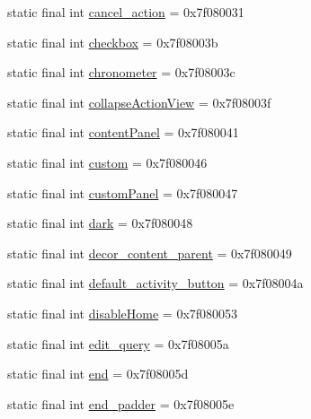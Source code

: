\begin{DoxyCompactItemize}
\item 
static final int \mbox{\hyperlink{classcom_1_1google_1_1android_1_1gms_1_1R_1_1id_aca37f162b8f3ae2cd62fa79e02360013}{cancel\+\_\+action}} = 0x7f080031
\item 
static final int \mbox{\hyperlink{classcom_1_1google_1_1android_1_1gms_1_1R_1_1id_aff61d000eabc6c95cc2b581cb82c539c}{checkbox}} = 0x7f08003b
\item 
static final int \mbox{\hyperlink{classcom_1_1google_1_1android_1_1gms_1_1R_1_1id_a2cdd0608eb7890dd84b1ee9c8e24869d}{chronometer}} = 0x7f08003c
\item 
static final int \mbox{\hyperlink{classcom_1_1google_1_1android_1_1gms_1_1R_1_1id_a7b72f687177eb88aa5803caab66fad1a}{collapse\+Action\+View}} = 0x7f08003f
\item 
static final int \mbox{\hyperlink{classcom_1_1google_1_1android_1_1gms_1_1R_1_1id_a9fb201b9d91402750993d4fae21aefe9}{content\+Panel}} = 0x7f080041
\item 
static final int \mbox{\hyperlink{classcom_1_1google_1_1android_1_1gms_1_1R_1_1id_a6806830d9e9d48de988e9d3dd2b0370f}{custom}} = 0x7f080046
\item 
static final int \mbox{\hyperlink{classcom_1_1google_1_1android_1_1gms_1_1R_1_1id_a343610fb96592a2eef6a718d5439aa1a}{custom\+Panel}} = 0x7f080047
\item 
static final int \mbox{\hyperlink{classcom_1_1google_1_1android_1_1gms_1_1R_1_1id_ad4e02011f5e0cc3a2197b46ccb27eaa1}{dark}} = 0x7f080048
\item 
static final int \mbox{\hyperlink{classcom_1_1google_1_1android_1_1gms_1_1R_1_1id_a7f14d76052b8044caa5131884a9c485f}{decor\+\_\+content\+\_\+parent}} = 0x7f080049
\item 
static final int \mbox{\hyperlink{classcom_1_1google_1_1android_1_1gms_1_1R_1_1id_a2bea0da390acc8e80cafc9a3999bd225}{default\+\_\+activity\+\_\+button}} = 0x7f08004a
\item 
static final int \mbox{\hyperlink{classcom_1_1google_1_1android_1_1gms_1_1R_1_1id_aeb973dd1584d0143bfdb11d6e1b0a75e}{disable\+Home}} = 0x7f080053
\item 
static final int \mbox{\hyperlink{classcom_1_1google_1_1android_1_1gms_1_1R_1_1id_aa2400ae2f5a0830a179d85ae609cded9}{edit\+\_\+query}} = 0x7f08005a
\item 
static final int \mbox{\hyperlink{classcom_1_1google_1_1android_1_1gms_1_1R_1_1id_a5a99f00bcab168defeb9ced2962e8236}{end}} = 0x7f08005d
\item 
static final int \mbox{\hyperlink{classcom_1_1google_1_1android_1_1gms_1_1R_1_1id_a4d80e222ec6bae5546b705bb6222ba5a}{end\+\_\+padder}} = 0x7f08005e

\end{DoxyCompactItemize}
